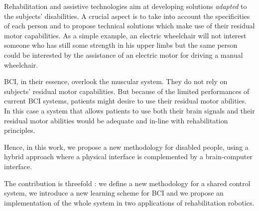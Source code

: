 Rehabilitation and assistive technologies aim at developing solutions \emph{adapted} to the subjects' disabilities.
A crucial aspect is to take into account the specificities of each person and to propose technical solutions which make use of their residual motor capabilities.
As a simple example, an electric wheelchair will not interest someone who has still some strength in his upper limbs but the same person could be interested by the assistance of an electric motor for driving a manual wheelchair. 


BCI, in their essence, overlook the muscular system. 
They do not rely on subjects' residual motor capabilities. But because of the limited performances of current BCI systems, patients might desire to use their residual motor abilities. 
In this case a system that allows patients to use both their brain signals and their residual motor abilities would be adequate and in-line with rehabilitation principles. 

Hence, in this work, we propose a new methodology for disabled people, using a hybrid approach where a physical interface is complemented by a brain-computer interface. 

The contribution is threefold : we define a new methodology for a shared control system, we introduce a new learning scheme for BCI and we propose an implementation of the whole system in two applications of rehabilitation robotics. 

